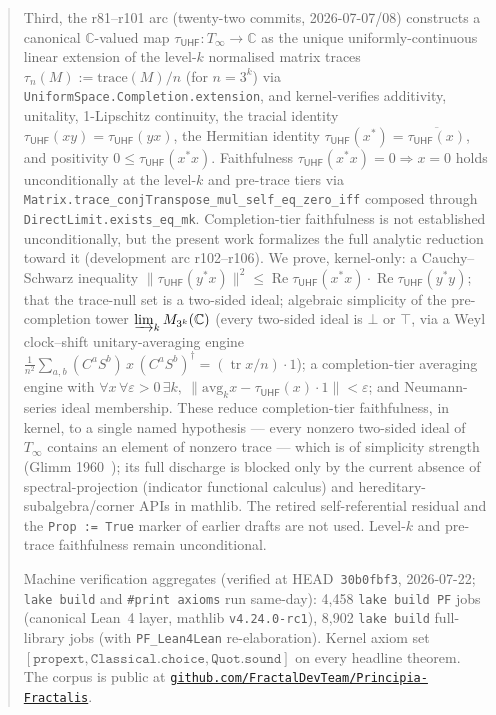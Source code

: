 \documentclass[11pt,a4paper]{amsart}
\theoremstyle{plain}
\theoremstyle{definition}
\begin{document}
\begin{abstract}
\noindent Third, the r81--r101 arc (twenty-two commits, 2026-07-07/08) constructs a canonical $\mathbb{C}$-valued map $\tau_{\textsf{UHF}} \colon T_\infty \to \mathbb{C}$ as the unique uniformly-continuous linear extension of the level-$k$ normalised matrix traces $\tau_n(M) := \mathrm{trace}(M)/n$ (for $n = 3^k$) via \texttt{UniformSpace.Completion.extension}, and kernel-verifies additivity, unitality, 1-Lipschitz continuity, the tracial identity $\tau_{\textsf{UHF}}(xy) = \tau_{\textsf{UHF}}(yx)$, the Hermitian identity $\tau_{\textsf{UHF}}(x^*) = \overline{\tau_{\textsf{UHF}}(x)}$, and positivity $0 \le \tau_{\textsf{UHF}}(x^* x)$. Faithfulness $\tau_{\textsf{UHF}}(x^* x) = 0 \Rightarrow x = 0$ holds unconditionally at the level-$k$ and pre-trace tiers via \texttt{Matrix.trace\_conjTranspose\_mul\_self\_eq\_zero\_iff} composed through \texttt{DirectLimit.exists\_eq\_mk}. Completion-tier faithfulness is not established unconditionally, but the present work formalizes the full analytic reduction toward it (development arc r102--r106). We prove, kernel-only: a Cauchy--Schwarz inequality $\|\tau_{\textsf{UHF}}(y^*x)\|^2 \le \operatorname{Re}\tau_{\textsf{UHF}}(x^*x)\cdot\operatorname{Re}\tau_{\textsf{UHF}}(y^*y)$; that the trace-null set is a two-sided ideal; algebraic simplicity of the pre-completion tower $\varinjlim_k M_{3^k}(\mathbb{C})$ (every two-sided ideal is $\bot$ or $\top$, via a Weyl clock--shift unitary-averaging engine $\tfrac{1}{n^2}\sum_{a,b}(C^aS^b)\,x\,(C^aS^b)^\dagger = (\operatorname{tr}x/n)\cdot 1$); a completion-tier averaging engine with $\forall x\,\forall\varepsilon>0\,\exists k,\ \|\mathrm{avg}_k x - \tau_{\textsf{UHF}}(x)\cdot 1\| < \varepsilon$; and Neumann-series ideal membership. These reduce completion-tier faithfulness, in kernel, to a single named hypothesis  --- every nonzero two-sided ideal of $T_\infty$ contains an element of nonzero trace --- which is of simplicity strength (Glimm 1960~\cite{glimm1960}); its full discharge is blocked only by the current absence of spectral-projection (indicator functional calculus) and hereditary-subalgebra/corner APIs in mathlib. The retired self-referential residual and the \texttt{Prop := True} marker of earlier drafts are not used. Level-$k$ and pre-trace faithfulness remain unconditional.

\smallskip

\noindent Machine verification aggregates (verified at HEAD~\texttt{30b0fbf3}, 2026-07-22; \texttt{lake build} and \texttt{\#print axioms} run same-day): 4{,}458 \texttt{lake build PF} jobs (canonical Lean~4 layer, mathlib \texttt{v4.24.0-rc1}), 8{,}902 \texttt{lake build} full-library jobs (with \texttt{PF\_Lean4Lean} re-elaboration). Kernel axiom set $[\texttt{propext}, \texttt{Classical.choice}, \texttt{Quot.sound}]$ on every headline theorem. The corpus is public at \href{https://github.com/FractalDevTeam/Principia-Fractalis}{\texttt{github.com/FractalDevTeam/Principia-Fractalis}}.
\end{abstract}
\end{document}
